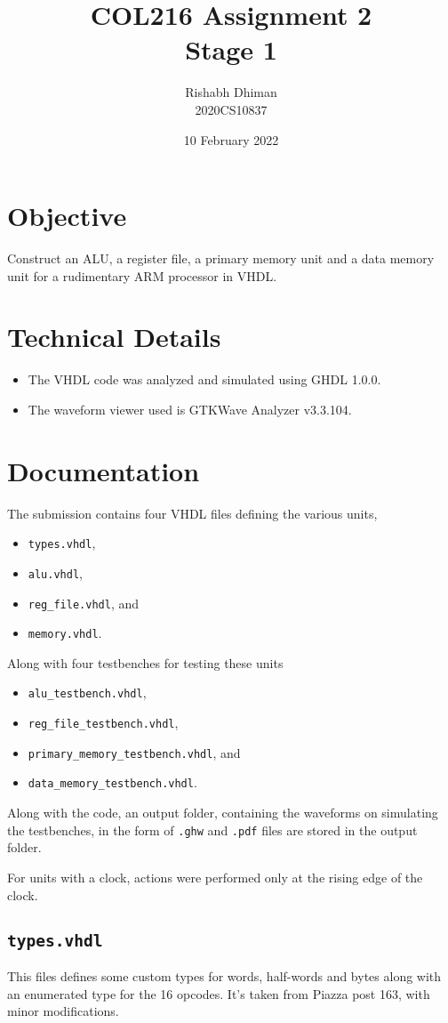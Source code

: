 \documentclass[a4paper]{scrartcl}
\title{COL216 Assignment 2\\{\Large Stage 1}}
\date{10 February 2022}
\author{Rishabh Dhiman\\ 2020CS10837}
\renewcommand{\tt}{\texttt}
\begin{document}
\maketitle

\section{Objective}
Construct an ALU, a register file, a primary memory unit and a data memory unit for a rudimentary ARM processor in VHDL.

\section{Technical Details}
\begin{itemize}
	\item The VHDL code was analyzed and simulated using GHDL 1.0.0.
	\item The waveform viewer used is GTKWave Analyzer v3.3.104.
\end{itemize}

\section{Documentation}
The submission contains four VHDL files defining the various units,
\begin{itemize}
	\item \tt{types.vhdl},
	\item \tt{alu.vhdl},
	\item \tt{reg_file.vhdl}, and
	\item \tt{memory.vhdl}.
\end{itemize}
Along with four testbenches for testing these units
\begin{itemize}
	\item \tt{alu_testbench.vhdl},
	\item \tt{reg_file_testbench.vhdl},
	\item \tt{primary_memory_testbench.vhdl}, and
	\item \tt{data_memory_testbench.vhdl}.
\end{itemize}

Along with the code, an output folder, containing the waveforms on simulating the testbenches, in the form of \tt{.ghw} and \tt{.pdf} files are stored in the output folder.

For units with a clock, actions were performed only at the rising edge of the clock.

\subsection*{\tt{types.vhdl}}
This files defines some custom types for words, half-words and bytes along with an enumerated type for the 16 opcodes. It's taken from Piazza post 163, with minor modifications.
\end{document}
